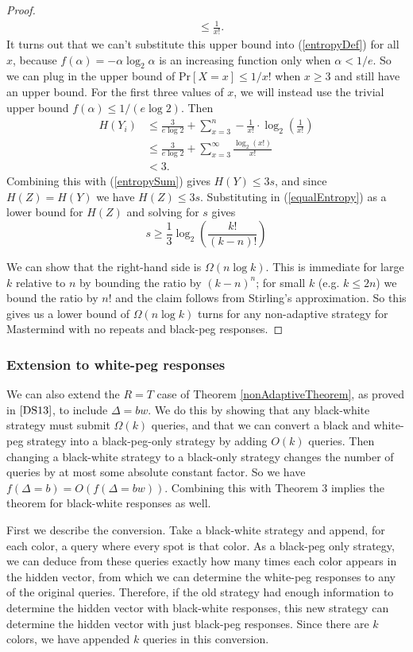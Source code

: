 \documentclass[12pt, a4paper]{article}
\begin{document}
\begin{proof}
\begin{align*}
		&\leq \frac{1}{x!}.
	\end{align*}
	It turns out that we can't substitute this upper bound into  (\ref{entropyDef}) for all $x$, because $f(\alpha)=-\alpha\log_2\alpha$ is an increasing function only when $\alpha<1/e$. So we can plug in the upper bound of $\text{Pr}[X=x]\le 1/x!$ when $x\ge 3$ and still have an upper bound. For the first three values of $x$, we will instead use the trivial upper bound $f(\alpha)\le 1/(e\log 2)$. Then
	\begin{align*}
		H(Y_i) &\leq \frac{3}{e\log 2}+\sum_{x=3}^n-\frac{1}{x!}\cdot\log_2\left(\frac{1}{x!}\right)\\
		&\le \frac{3}{e\log 2}+\sum_{x=3}^\infty \frac{\log_2(x!)}{x!}\\
		&<3.
	\end{align*}
	Combining this with (\ref{entropySum}) gives $H(Y) \leq 3s$, and since $H(Z) = H(Y)$ we have $H(Z) \leq 3s$. Substituting in (\ref{equalEntropy}) as a lower bound for $H(Z)$ and solving for $s$ gives
	\begin{equation*}
	s \geq \frac{1}{3}\log_2\left(\frac{k!}{(k-n)!}\right)
	\end{equation*}
	
	We can show that the right-hand side is $\Omega(n\log k)$. This is immediate for large $k$ relative to $n$ by bounding the ratio by $(k-n)^n$; for small $k$ (e.g. $k \leq 2n$) we bound the ratio by $n!$ and the claim follows from Stirling's approximation. So this gives us a lower bound of $\Omega(n \log k)$ turns for any non-adaptive strategy for Mastermind with no repeats and black-peg responses.
\end{proof}
\subsubsection{Extension to white-peg responses}
We can also extend the $R=T$ case of Theorem \ref{nonAdaptiveTheorem}, as proved in $\cite{DS13}$, to include $\Delta = bw$. We do this by showing that any black-white strategy must submit $\Omega(k)$ queries, and that we can convert a black and white-peg strategy into a black-peg-only strategy by adding $O(k)$ queries. 
Then changing a black-white strategy to a black-only strategy changes the number of queries by at most some absolute constant factor. So we have $f(\Delta = b) = O(f(\Delta = bw))$. Combining this with Theorem 3 implies the theorem for black-white responses as well.

First we describe the conversion. Take a black-white strategy and append, for each color, a query where every spot is that color. As a black-peg only strategy, we can deduce from these queries exactly how many times each color appears in the hidden vector, from which we can determine the white-peg responses to any of the original queries. Therefore, if the old strategy had enough information to determine the hidden vector with black-white responses, this new strategy can determine the hidden vector with just black-peg responses. Since there are $k$ colors, we have appended $k$ queries in this conversion. 
\end{document}
